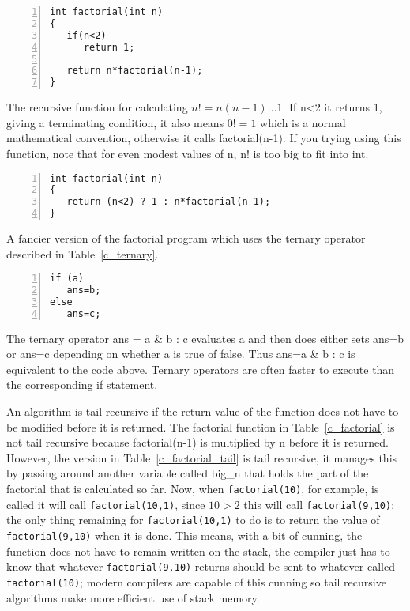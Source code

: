\documentclass[11pt,a4paper]{scrartcl}
\begin{document}
\begin{table}[b]
\begin{lstlisting}[numbers=left]
int factorial(int n)
{
   if(n<2)
      return 1;

   return n*factorial(n-1);
}

\end{lstlisting}
\caption{The recursive function for calculating $n!=n(n-1)\ldots 1$. If n<2 it returns 1, giving a terminating condition, it also means $0!=1$ which is a normal mathematical convention, otherwise it calls factorial(n-1). If you trying using this function, note that for even modest values of n, n! is too big to fit into int.\label{c_factorial}}
\end{table}


\begin{table}
\begin{lstlisting}[numbers=left]
int factorial(int n)
{
   return (n<2) ? 1 : n*factorial(n-1);
}

\end{lstlisting}
\caption{A fancier version of the factorial program which uses the ternary operator described in Table~\ref{c_ternary}.\label{c_factorial_fancy}}
\end{table}


\begin{table}
\begin{lstlisting}[numbers=left]
if (a)
   ans=b;
else 
   ans=c;
\end{lstlisting}
\caption{The ternary operator ans = a \& b : c evaluates a and then
  does either sets ans=b or ans=c depending on whether a is true of
  false.  Thus ans=a \& b : c is equivalent to the code above. Ternary
  operators are often faster to execute than the corresponding if
  statement.\label{c_ternary}}
\end{table}

An algorithm is tail recursive if the return value of the function
does not have to be modified before it is returned. The factorial
function in Table~\ref{c_factorial} is not tail recursive because
factorial(n-1) is multiplied by n before it is returned. However, the
version in Table~\ref{c_factorial_tail} is tail recursive, it manages
this by passing around another variable called big\_n that holds the
part of the factorial that is calculated so far. Now, when
\texttt{factorial(10)}, for example, is called it will call
\texttt{factorial(10,1)}, since $10>2$ this will call
\texttt{factorial(9,10)}; the only thing remaining for
\texttt{factorial(10,1)} to do is to return the value of
\texttt{factorial(9,10)} when it is done. This means, with a bit of
cunning, the function does not have to remain written on the stack,
the compiler just has to know that whatever \texttt{factorial(9,10)}
returns should be sent to whatever called \texttt{factorial(10)};
modern compilers are capable of this cunning so tail recursive
algorithms make more efficient use of stack memory.
\end{document}
